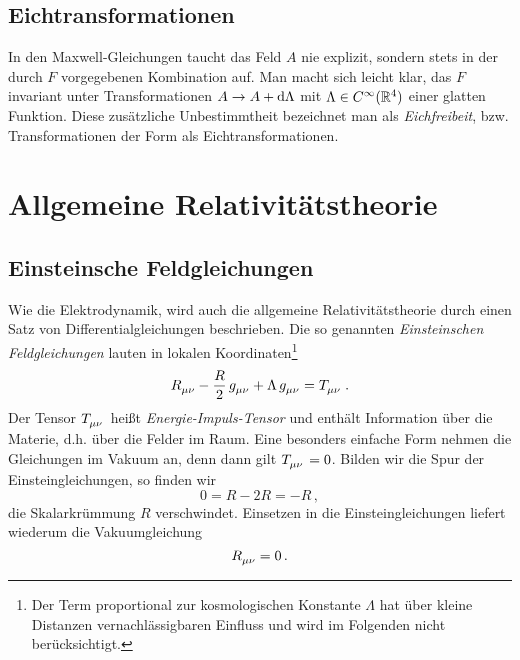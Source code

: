 \subsection{Eichtransformationen}
In den Maxwell-Gleichungen taucht das Feld $A$ nie explizit, sondern stets in
der durch $F$ vorgegebenen Kombination auf. Man macht sich leicht klar, das $F$
invariant unter Transformationen $A\to A+\dif\Lambda$ mit $\Lambda\in
C^\infty(\mathbb{R}^4)$ einer glatten Funktion. Diese zusätzliche Unbestimmtheit
bezeichnet man als \emph{Eichfreibeit}, bzw. Transformationen der Form als
Eichtransformationen.
\section{Allgemeine Relativitätstheorie}
\subsection{Einsteinsche Feldgleichungen}
Wie die Elektrodynamik, wird auch die allgemeine Relativitätstheorie durch einen
Satz von Differentialgleichungen beschrieben. Die so genannten
\emph{Einsteinschen Feldgleichungen} lauten in lokalen Koordinaten\footnote{Der Term proportional
zur kosmologischen Konstante $\Lambda$ hat über kleine Distanzen vernachlässigbaren Einfluss und wird im Folgenden nicht berücksichtigt.}
\begin{equation}
\tensor{R}{_\mu_\nu} - \frac{R}{2}\, \tensor{g}{_\mu_\nu}
+\Lambda\, \tensor{g}{_\mu_\nu}
=\tensor{T}{_\mu_\nu}\,.
\end{equation}
Der Tensor $\tensor{T}{_\mu_\nu}$ heißt \emph{Energie-Impuls-Tensor} und
enthält Information über die Materie, d.h. über die Felder im Raum. Eine
besonders einfache Form nehmen die Gleichungen im Vakuum an, denn dann gilt
$\tensor{T}{_\mu_\nu}=0$.
Bilden wir die Spur der Einsteingleichungen, so finden wir
\begin{equation}
0=R- 2 R =-R\,,
\end{equation}
die Skalarkrümmung $R$ verschwindet.
Einsetzen in die Einsteingleichungen liefert wiederum die Vakuumgleichung
\begin{equation}
\tensor{R}{_\mu_\nu}=0\,.
\end{equation}
